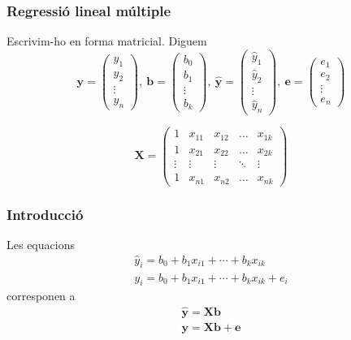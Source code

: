 \documentclass[12pt,t]{beamer}
\theoremstyle{plain}
\theoremstyle{definition}
\begin{document}
\begin{frame}
\frametitle{Regressió lineal múltiple}
Escrivim-ho en forma matricial. Diguem
$$
\mathbf{y}=
\left(
\begin{array}{l}
y_1\\ y_2\\ \vdots\\ y_n
\end{array}
\right),\ \mathbf{b}=\left(
\begin{array}{l}
b_0\\ b_1 \\ \vdots\\b_k
\end{array}
\right),\ \mathbf{\widehat{y}}=\left(
\begin{array}{l}
\widehat{y}_1\\ \widehat{y}_2\\ \vdots\\\widehat{y}_n
\end{array}
\right),\ \mathbf{e}=\left(
\begin{array}{l}
e_1\\ e_2\\ \vdots\\ e_n
\end{array}
\right)
$$
\medskip

$$
\mathbf{X}=\left(
\begin{array}{lllll}
1&x_{11}&x_{12}&\ldots&x_{1k}\\
1&x_{21}&x_{22}&\ldots&x_{2k}\\
\vdots&\vdots&\vdots&\ddots&\vdots\\
1&x_{n1}&x_{n2}&\ldots&x_{nk}
\end{array}
\right)$$
\end{frame}


\begin{frame}[fragile]
\frametitle{Introducció}
Les equacions
$$
\begin{array}{l}
\widehat{y}_i=b_0+b_1 x_{i 1}+\cdots+b_{k} x_{i k}\\
y_i=b_0+b_1 x_{i 1}+\cdots+b_{k} x_{i k}+e_i
\end{array}
$$
corresponen a
$$
\begin{array}{l}
\mathbf{\widehat{y}} = \mathbf{X}\mathbf{b} \\
\mathbf{y}=   \mathbf{X}\mathbf{b}+\mathbf{e}\\
\end{array}
$$
\end{frame}
\end{document}
